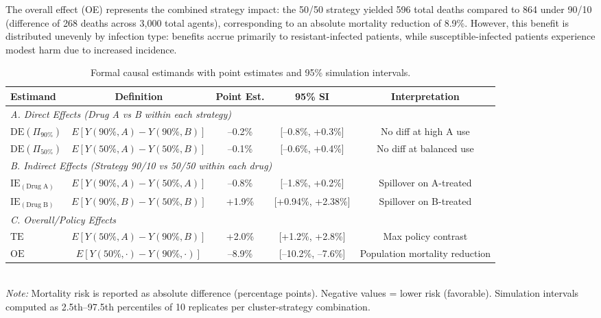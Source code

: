The overall effect (OE) represents the combined strategy impact: the 50/50 strategy yielded
596 total deaths compared to 864 under 90/10 (difference of 268 deaths across 3,000 total agents),
corresponding to an absolute mortality reduction of 8.9\%. However, this benefit is distributed
unevenly by infection type: benefits accrue primarily to resistant-infected patients, while
susceptible-infected patients experience modest harm due to increased incidence.

\begin{table}[htbp]
\centering
\caption{Formal causal estimands with point estimates and 95\% simulation intervals.}
\label{tab:estimands}
\begin{tabular}{lcccc}
\toprule
\textbf{Estimand} & \textbf{Definition} & \textbf{Point Est.} & \textbf{95\% SI} & \textbf{Interpretation} \\
\midrule
\multicolumn{5}{l}{\textit{A. Direct Effects (Drug A vs B within each strategy)}} \\
$\mathrm{DE}(\Pi_{90\%})$ & $E[Y(90\%, A) - Y(90\%, B)]$ & --0.2\% & [--0.8\%, +0.3\%] & No diff at high A use \\
$\mathrm{DE}(\Pi_{50\%})$ & $E[Y(50\%, A) - Y(50\%, B)]$ & --0.1\% & [--0.6\%, +0.4\%] & No diff at balanced use \\
\midrule
\multicolumn{5}{l}{\textit{B. Indirect Effects (Strategy 90/10 vs 50/50 within each drug)}} \\
$\mathrm{IE}_{(\text{Drug A})}$ & $E[Y(90\%, A) - Y(50\%, A)]$ & --0.8\% & [--1.8\%, +0.2\%] & Spillover on A-treated \\
$\mathrm{IE}_{(\text{Drug B})}$ & $E[Y(90\%, B) - Y(50\%, B)]$ & +1.9\% & [+0.94\%, +2.38\%] & Spillover on B-treated \\
\midrule
\multicolumn{5}{l}{\textit{C. Overall/Policy Effects}} \\
$\mathrm{TE}$ & $E[Y(50\%, A) - Y(90\%, B)]$ & +2.0\% & [+1.2\%, +2.8\%] & Max policy contrast \\
$\mathrm{OE}$ & $E[Y(50\%, \cdot) - Y(90\%, \cdot)]$ & --8.9\% & [--10.2\%, --7.6\%] & Population mortality reduction \\
\bottomrule
\end{tabular}
\\
\footnotesize
\textit{Note:} Mortality risk is reported as absolute difference (percentage points).
Negative values = lower risk (favorable). Simulation intervals computed as 2.5th--97.5th percentiles
of 10 replicates per cluster-strategy combination.
\end{table}


